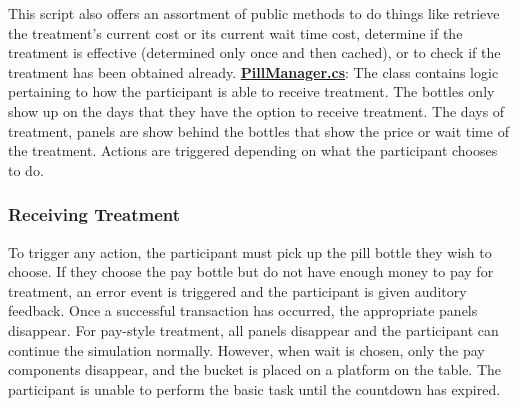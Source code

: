 \documentclass{article}
\begin{document}
This script also offers an assortment of public methods to do things like retrieve the treatment's current cost or its current wait time cost, determine if the treatment is effective (determined only once and then cached), or to check if the treatment has been obtained already. \newline \newline
\href{https://bit.ly/2JDPChz}{\textbf{PillManager.cs}}: The class contains logic pertaining to how the participant is able to receive treatment. The bottles only show up on the days that they have the option to receive treatment. The days of treatment, panels are show behind the bottles that show the price or wait time of the treatment. Actions are triggered depending on what the participant chooses to do.

\subsubsection{Receiving Treatment} 
To trigger any action, the participant must pick up the pill bottle they wish to choose. If they choose the pay bottle but do not have enough money to pay for treatment, an error event is triggered and the participant is given auditory feedback. Once a successful transaction has occurred, the appropriate panels disappear. For pay-style treatment, all panels disappear and the participant can continue the simulation normally. However, when wait is chosen, only the pay components disappear, and the bucket is placed on a platform on the table. The participant is unable to perform the basic task until the countdown has expired.
\end{document}
